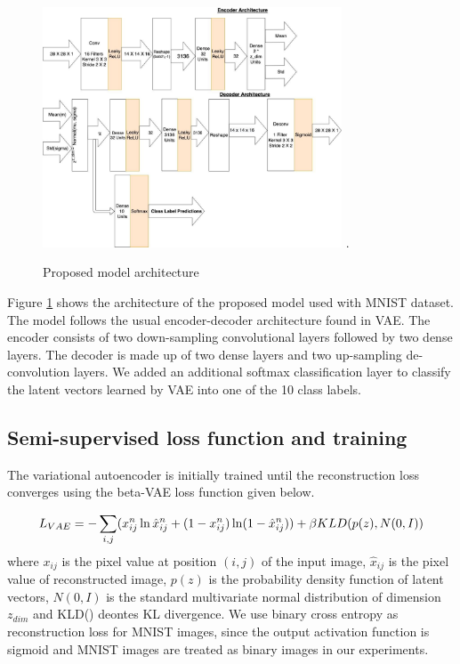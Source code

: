 \documentclass[runningheads]{llncs}
\begin{document}
\begin{figure}[!t]
\centering
\includegraphics[width=3.5in]{vae_model_architecture_classification_v2}
\DeclareGraphicsExtensions.
\caption{Proposed model architecture}
\label{vae_architecture}
\end{figure}

Figure \ref{vae_architecture} shows the architecture of the proposed model used with MNIST dataset.
The model follows the usual encoder-decoder architecture found in VAE.
The encoder consists of two down-sampling convolutional layers followed by two dense layers.
The decoder is made up of two dense layers and two up-sampling de-convolution layers.
We added an additional softmax classification layer to classify the latent vectors learned by VAE into one of the 10 class labels.

\subsection{Semi-supervised loss function and training}\label{section_loss_function}
The variational autoencoder is initially trained until the reconstruction loss converges using the beta-VAE loss function\cite{beta_vae} given below.

\begin{equation} \label{vae_loss_eqn}
L_{VAE} = -\sum_{i, j}(x_{ij}^n \ln \hat{x}_{ij}^n
+ (1 - x_{ij}^n) \ln(1 -  \hat{x}_{ij}^n ) )\\
    +\beta KLD(p(z), N(0,I))
\end{equation}
where   $x_{ij}$ is the pixel value at position $(i, j)$ of the input image, $\hat{x}_{ij}$ is the pixel value of reconstructed image, $p(z)$ is the probability density function of latent vectors, $N(0,I)$ is the standard multivariate normal distribution of dimension $z_{dim}$ and KLD() deontes KL divergence.
We use binary cross entropy as reconstruction loss for MNIST images, since the output activation function is sigmoid and MNIST images are treated as binary images in our experiments.
\end{document}
